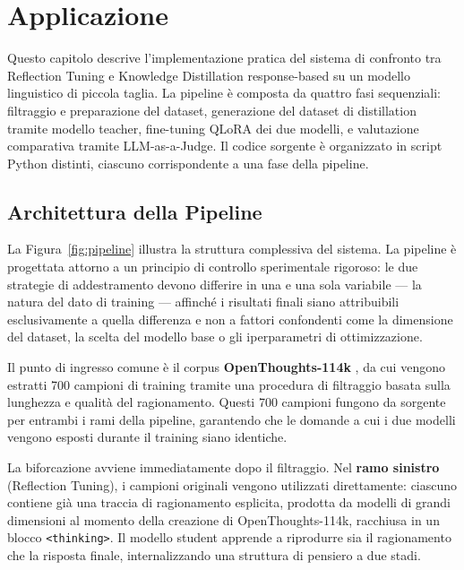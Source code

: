 \chapter{Applicazione}
\label{cap:3}

Questo capitolo descrive l'implementazione pratica del sistema di
confronto tra Reflection Tuning e Knowledge Distillation response-based
su un modello linguistico di piccola taglia. La pipeline è composta da
quattro fasi sequenziali: filtraggio e preparazione del dataset,
generazione del dataset di distillation tramite modello teacher,
fine-tuning QLoRA dei due modelli, e valutazione comparativa tramite
LLM-as-a-Judge. Il codice sorgente è organizzato in script Python
distinti, ciascuno corrispondente a una fase della pipeline.

\section{Architettura della Pipeline}
\label{sec:pipeline_overview}

La Figura~\ref{fig:pipeline} illustra la struttura complessiva del
sistema. La pipeline è progettata attorno a un principio di controllo
sperimentale rigoroso: le due strategie di addestramento devono
differire in una e una sola variabile --- la natura del dato di
training --- affinché i risultati finali siano attribuibili
esclusivamente a quella differenza e non a fattori confondenti come
la dimensione del dataset, la scelta del modello base o gli
iperparametri di ottimizzazione.

Il punto di ingresso comune è il corpus \textbf{OpenThoughts-114k}
\cite{openthoughts2024}, da cui vengono estratti 700 campioni di
training tramite una procedura di filtraggio basata sulla lunghezza
e qualità del ragionamento. Questi 700 campioni fungono da sorgente
per entrambi i rami della pipeline, garantendo che le domande a cui
i due modelli vengono esposti durante il training siano identiche.

La biforcazione avviene immediatamente dopo il filtraggio. Nel
\textbf{ramo sinistro} (Reflection Tuning), i campioni originali
vengono utilizzati direttamente: ciascuno contiene già una traccia
di ragionamento esplicita, prodotta da modelli di grandi dimensioni
al momento della creazione di OpenThoughts-114k, racchiusa in un
blocco \texttt{<thinking>}. Il modello student apprende a riprodurre
sia il ragionamento che la risposta finale, internalizzando una
struttura di pensiero a due stadi.

